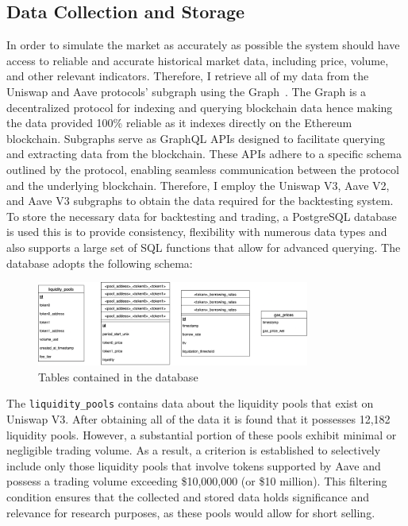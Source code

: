 \subsection{Data Collection and Storage}
In order to simulate the market as accurately as possible the system should have access to reliable and accurate historical market data, including price, volume, and other relevant indicators. Therefore, I retrieve all of my data from the Uniswap and Aave protocols' subgraph using the Graph~\cite{noauthor_graph_nodate}. The Graph is a decentralized protocol for indexing and querying blockchain data hence making the data provided 100\% reliable as it indexes directly on the Ethereum blockchain. Subgraphs serve as GraphQL APIs designed to facilitate querying and extracting data from the blockchain. These APIs adhere to a specific schema outlined by the protocol, enabling seamless communication between the protocol and the underlying blockchain. Therefore, I employ the Uniswap V3, Aave V2, and Aave V3 subgraphs to obtain the data required for the backtesting system.
\\[5mm]
To store the necessary data for backtesting and trading, a PostgreSQL database is used this is to provide consistency, flexibility with numerous data types and also supports a large set of SQL functions that allow for advanced querying. The database adopts the following schema:
\begin{figure}[!htb]
    \centering
    \includegraphics[width=0.8\textwidth]{project/Images/database_tables.png}
    \caption{Tables contained in the database \label{fig:database}}
\end{figure}
The \texttt{liquidity\_pools} contains data about the liquidity pools that exist on Uniswap V3. After obtaining all of the data it is found that it possesses 12,182 liquidity pools. However, a substantial portion of these pools exhibit minimal or negligible trading volume. As a result, a criterion is established to selectively include only those liquidity pools that involve tokens supported by Aave and possess a trading volume exceeding \$10,000,000 (or \$10 million). This filtering condition ensures that the collected and stored data holds significance and relevance for research purposes, as these pools would allow for short selling.
